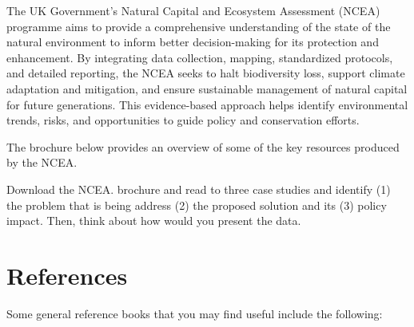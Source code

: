 \documentclass[
  letterpaper,
  DIV=11,
  numbers=noendperiod]{scrartcl}
\begin{document}
\begin{tcolorbox}[enhanced jigsaw, coltitle=black, colframe=quarto-callout-note-color-frame, bottomrule=.15mm, leftrule=.75mm, toptitle=1mm, titlerule=0mm, title={Example of Natural Capital and Ecosystem Assessment (NCEA) programme}, bottomtitle=1mm, toprule=.15mm, rightrule=.15mm, arc=.35mm, opacityback=0, opacitybacktitle=0.6, left=2mm, colbacktitle=quarto-callout-note-color!10!white, breakable, colback=white]

The UK Government's Natural Capital and Ecosystem Assessment (NCEA)
programme aims to provide a comprehensive understanding of the state of
the natural environment to inform better decision-making for its
protection and enhancement. By integrating data collection, mapping,
standardized protocols, and detailed reporting, the NCEA seeks to halt
biodiversity loss, support climate adaptation and mitigation, and ensure
sustainable management of natural capital for future generations. This
evidence-based approach helps identify environmental trends, risks, and
opportunities to guide policy and conservation efforts.

The brochure below provides an overview of some of the key resources
produced by the NCEA.

\end{tcolorbox}

\begin{tcolorbox}[enhanced jigsaw, coltitle=black, colframe=quarto-callout-tip-color-frame, bottomrule=.15mm, leftrule=.75mm, toptitle=1mm, titlerule=0mm, title={Exercise 6}, bottomtitle=1mm, toprule=.15mm, rightrule=.15mm, arc=.35mm, opacityback=0, opacitybacktitle=0.6, left=2mm, colbacktitle=quarto-callout-tip-color!10!white, breakable, colback=white]

Download the NCEA. brochure and read to three case studies and identify
(1) the problem that is being address (2) the proposed solution and its
(3) policy impact. Then, think about how would you present the data.

\end{tcolorbox}

\section*{References}\label{references}

Some general reference books that you may find useful include the
following:
\end{document}
